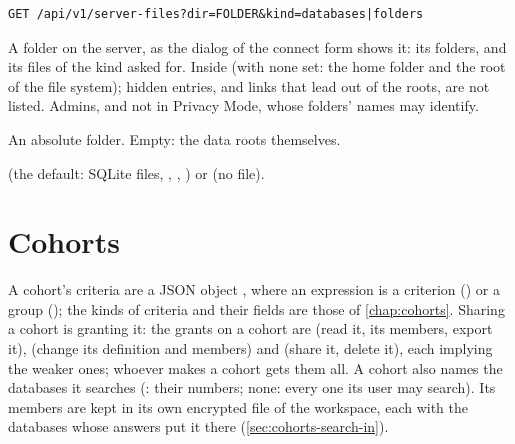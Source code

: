 \begin{lstlisting}[style=signature]
GET /api/v1/server-files?dir=FOLDER&kind=databases|folders
\end{lstlisting}
A folder on the server, as the  dialog of the connect form shows it: its folders,
and its files of the kind asked for. Inside  (with none set: the home folder
and the root of the file system); hidden entries, and links that lead out of the roots, are not
listed. Admins, and not in Privacy Mode, whose folders' names may identify.
\begin{params}
\item[dir] An absolute folder. Empty: the data roots themselves.
\item[kind]  (the default: SQLite files, , ,
  ) or  (no file).
\end{params}

\section{Cohorts}
\label{sec:http-api-cohorts}

A cohort's criteria are a JSON object , where an expression is a criterion () or a group
(); the kinds of criteria and their fields
are those of \cref{chap:cohorts}. Sharing a cohort is granting it: the grants on a cohort are
 (read it, its members, export it),  (change its definition and members) and
 (share it, delete it), each implying the weaker ones; whoever makes a cohort gets
them all. A cohort also names the databases it searches (: their numbers; none:
every one its user may search). Its members are kept in its own encrypted file of the workspace,
each with the databases whose answers put it there (\cref{sec:cohorts-search-in}).

